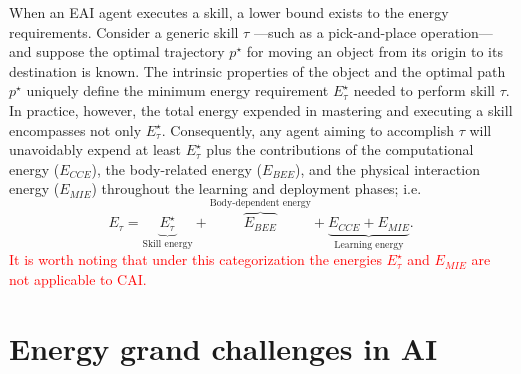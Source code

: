 \documentclass[12pt]{article}
\newcommand\myhl[1]{\textcolor{red}{#1}}
\begin{document}
When an EAI agent executes a skill, a lower bound exists to the energy requirements. Consider a generic skill $\tau$ ---such as a pick-and-place operation--- and suppose the optimal trajectory $p^\star$ for moving an object from its origin to its destination is known. The intrinsic properties of the object and the optimal path $p^\star$ uniquely define the minimum energy requirement $E^\star_{\tau}$ needed to perform skill $\tau$. In practice, however, the total energy expended in mastering and executing a skill encompasses not only $E^\star_{\tau}$. Consequently, any agent aiming to accomplish $\tau$ will unavoidably expend at least $E^\star_{\tau}$ plus the contributions of the computational energy ($E_{CCE}$), the body-related energy ($E_{BEE}$), and the physical interaction energy ($E_{MIE}$) throughout the learning and deployment phases; i.e.
\begin{equation}
	E_{\tau} =  \underbrace{E^\star_{\tau}}_{\text{Skill energy}} + \overbrace{E_{BEE}}^{\text{Body-dependent energy}} + \underbrace{E_{CCE} + E_{MIE}}_{\text{Learning energy}}.
\end{equation}
\myhl{It is worth noting that under this categorization the energies $E^\star_{\tau}$ and $E_{MIE}$ are not applicable to CAI.}

\section*{Energy grand challenges in AI}\label{sec:energy_grand_challenges}
\end{document}
